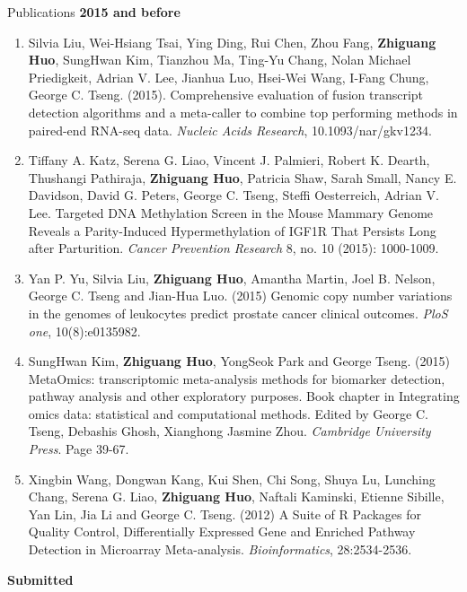 \documentclass{resume} %
\begin{document}
\begin{rSection}{Publications}
\textbf{2015 and before}
\begin{enumerate}[noitemsep,topsep=0pt,resume]
    \item Silvia Liu, Wei-Hsiang Tsai, Ying Ding, Rui Chen, Zhou Fang, {\bf Zhiguang Huo}, SungHwan Kim, Tianzhou Ma, Ting-Yu Chang, Nolan Michael Priedigkeit, Adrian V. Lee, Jianhua Luo, Hsei-Wei Wang, I-Fang Chung, George C. Tseng. (2015).
Comprehensive evaluation of fusion transcript detection algorithms and a meta-caller to combine top performing methods in paired-end RNA-seq data.
\emph{Nucleic Acids Research}, 10.1093/nar/gkv1234.

    \item Tiffany A. Katz, Serena G. Liao, Vincent J. Palmieri, Robert K. Dearth, Thushangi Pathiraja, {\bf Zhiguang Huo}, Patricia Shaw, Sarah Small, Nancy E. Davidson, David G. Peters, George C. Tseng, Steffi Oesterreich, Adrian V. Lee. Targeted DNA Methylation Screen in the Mouse Mammary Genome Reveals a Parity-Induced Hypermethylation of IGF1R That Persists Long after Parturition. \emph{Cancer Prevention Research} 8, no. 10 (2015): 1000-1009.

    \item Yan P. Yu, Silvia Liu, {\bf Zhiguang Huo}, Amantha Martin, Joel B. Nelson, George C. Tseng and Jian-Hua Luo. (2015) Genomic copy number variations in the genomes of leukocytes predict prostate cancer clinical outcomes. \emph{PloS one}, 10(8):e0135982.

\item SungHwan Kim,  {\bf Zhiguang Huo}, YongSeok Park and George Tseng.  (2015) MetaOmics: transcriptomic meta-analysis methods for biomarker detection, pathway analysis and other exploratory purposes. Book chapter in Integrating omics data: statistical and computational methods. Edited by George C. Tseng, Debashis Ghosh, Xianghong Jasmine Zhou. \emph{Cambridge University Press}. Page 39-67.

    \item Xingbin Wang, Dongwan Kang, Kui Shen, Chi Song, Shuya Lu, Lunching Chang, Serena G. Liao, {\bf Zhiguang Huo}, Naftali Kaminski, Etienne Sibille, Yan Lin, Jia Li and George C. Tseng. (2012) A Suite of R Packages for Quality Control, Differentially Expressed Gene and Enriched Pathway Detection in Microarray Meta-analysis. \emph{Bioinformatics}, 28:2534-2536.

\end{enumerate}

\textbf{Submitted}
\begin{enumerate}[noitemsep,topsep=0pt]


\end{enumerate}
\end{rSection}
\end{document}

